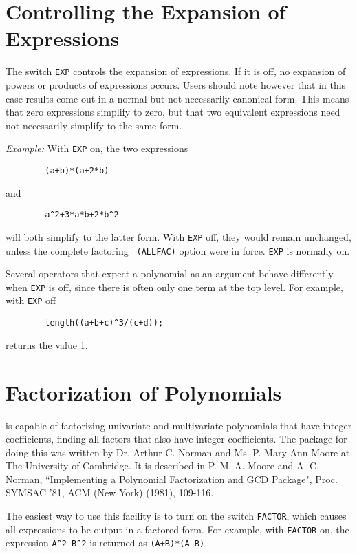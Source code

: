 \section{Controlling the Expansion of Expressions}

The switch {\tt EXP}  controls the expansion of expressions.  If
it is off, no expansion of powers or products of expressions occurs.
Users should note however that in this case results come out in a normal
but not necessarily canonical form.  This means that zero expressions
simplify to zero, but that two equivalent expressions need not necessarily
simplify to the same form.

{\it Example:} With {\tt EXP} on, the two expressions
\begin{verbatim}
        (a+b)*(a+2*b)
\end{verbatim}
and
\begin{verbatim}
        a^2+3*a*b+2*b^2
\end{verbatim}
will both simplify to the latter form.  With {\tt EXP}
off, they would remain unchanged, unless the complete factoring {\tt
(ALLFAC)} option were in force. {\tt EXP} is normally on.

Several operators that expect a polynomial as an argument behave
differently when {\tt EXP} is off, since there is often only one term at
the top level.  For example, with {\tt EXP} off
\begin{verbatim}
        length((a+b+c)^3/(c+d));
\end{verbatim}
returns the value 1.

\section{Factorization of Polynomials}
{\REDUCE} is capable of factorizing univariate and multivariate polynomials
that have integer coefficients, finding all factors that also have integer
coefficients. The package for doing this was written by Dr. Arthur C.
Norman and Ms. P. Mary Ann Moore at The University of Cambridge. It is
described in P. M. A. Moore and A. C. Norman, ``Implementing a Polynomial
Factorization and GCD Package", Proc. SYMSAC '81, ACM (New York) (1981),
109-116.

The easiest way to use this facility is to turn on the switch
{\tt FACTOR}, which causes all expressions to be output in a factored form.
For example, with {\tt FACTOR} on, the expression {\tt A\^{ }2-B\^{ }2} is
returned as {\tt (A+B)*(A-B)}.

